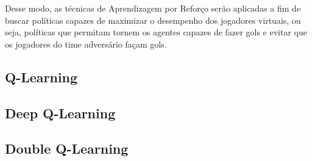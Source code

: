 Desse modo, as técnicas de Aprendizagem por Reforço serão aplicadas a fim de buscar políticas capazes de maximizar o desempenho dos jogadores virtuais, ou seja, políticas que permitam tornem os agentes capazes de fazer gols e evitar que os jogadores do time adversário façam gols.

\subsection{Q-Learning}

\subsection{Deep Q-Learning}

\subsection{Double Q-Learning}



